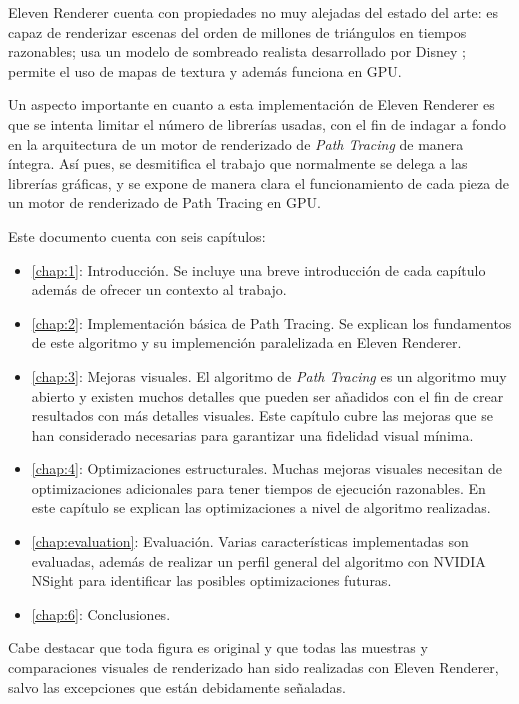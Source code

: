 Eleven Renderer cuenta con propiedades no muy alejadas del estado del arte: es capaz de renderizar escenas del orden de millones de triángulos en tiempos razonables; usa un modelo de sombreado realista desarrollado por Disney \cite{burley2012physically}; permite el uso de mapas de textura y además funciona en GPU.

Un aspecto importante en cuanto a esta implementación de Eleven Renderer es que se intenta limitar el número de librerías usadas, con el fin de indagar a fondo en la arquitectura de un motor de renderizado de \emph{Path Tracing} de manera íntegra. Así pues, se desmitifica el trabajo que normalmente se delega a las librerías gráficas, y se expone de manera clara el funcionamiento de cada pieza de un motor de renderizado de Path Tracing en GPU.

Este documento cuenta con seis capítulos:

\begin{itemize}
	\item \autoref{chap:1}: Introducción. Se incluye una breve introducción de cada capítulo además de ofrecer un contexto al trabajo.
	\item \autoref{chap:2}: Implementación básica de Path Tracing. Se explican los fundamentos de este algoritmo y su implemención paralelizada en Eleven Renderer. 
	\item \autoref{chap:3}: Mejoras visuales. El algoritmo de \emph{Path Tracing} es un algoritmo muy abierto y existen muchos detalles que pueden ser añadidos con el fin de crear resultados con más detalles visuales. Este capítulo cubre las mejoras que se han considerado necesarias para garantizar una fidelidad visual mínima.
	\item \autoref{chap:4}: Optimizaciones estructurales. Muchas mejoras visuales necesitan de optimizaciones adicionales para tener tiempos de ejecución razonables. En este capítulo se explican las optimizaciones a nivel de algoritmo realizadas.
	\item \autoref{chap:evaluation}: Evaluación. Varias características implementadas son evaluadas, además de realizar un perfil general del algoritmo con NVIDIA NSight para identificar las posibles optimizaciones futuras.
	\item \autoref{chap:6}: Conclusiones. 
\end{itemize}

Cabe destacar que toda figura es original y que todas las muestras y comparaciones visuales de renderizado han sido realizadas con Eleven Renderer, salvo las excepciones que están debidamente señaladas.

